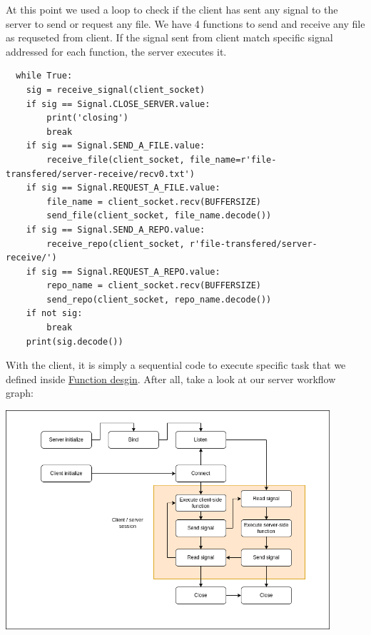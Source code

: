 \documentclass{article}
\begin{document}
At this point we used a loop to check if the client has sent any signal to the server to send or request any file. We have 4 functions to send and receive any file as requseted from client.
If the signal sent from client match specific signal addressed for each function, the server executes it. \pagebreak
\begin{lstlisting}
  while True:
    sig = receive_signal(client_socket)
    if sig == Signal.CLOSE_SERVER.value:
        print('closing')
        break
    if sig == Signal.SEND_A_FILE.value:
        receive_file(client_socket, file_name=r'file-transfered/server-receive/recv0.txt')
    if sig == Signal.REQUEST_A_FILE.value:
        file_name = client_socket.recv(BUFFERSIZE)
        send_file(client_socket, file_name.decode())
    if sig == Signal.SEND_A_REPO.value:
        receive_repo(client_socket, r'file-transfered/server-receive/')
    if sig == Signal.REQUEST_A_REPO.value:
        repo_name = client_socket.recv(BUFFERSIZE)
        send_repo(client_socket, repo_name.decode())
    if not sig:
        break
    print(sig.decode())
\end{lstlisting}
With the client, it is simply a sequential code to execute specific task that we defined inside \hyperref[functions]{Function desgin}.
After all, take a look at our server workflow graph:\\
\begin{center}
  \hspace{20pt}\includegraphics[width=0.9\textwidth]{TCP_server.png} 
\end{center}
\end{document}

